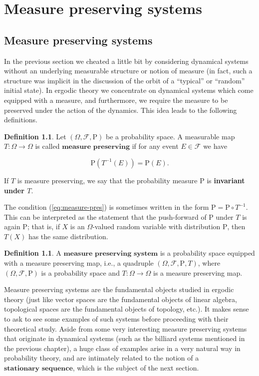 \documentclass[11pt]{report}
\theoremstyle{plain}
\theoremstyle{definition}
\newtheorem{defn}[thm]{Definition}
\begin{document}
\chapter{Measure preserving systems}

\section{Measure preserving systems}
In the previous section we cheated a little bit by considering dynamical systems without an underlying measurable structure or notion of measure (in fact, such a structure was implicit in the discussion of the orbit of a ``typical'' or ``random'' initial state). In ergodic theory we concentrate on dynamical systems which come equipped with a measure, and furthermore, we require the measure to be preserved under the action of the dynamics. This idea leads to the following definitions.

\begin{defn}
Let $(\Omega, \mathcal{F}, \mathrm{P})$ be a probability space. A measurable map $T:\Omega\to\Omega$ is called $\textbf{measure preserving}$ if for any event $E\in\mathcal{F}$ we have

\begin{equation*} \tag{13}\label{eq:measure-pres}
\mathrm{P}(T^{-1}(E)) = \mathrm{P}(E).
\end{equation*}

If $T$ is measure preserving, we say that the probability measure $\mathrm{P}$ is \textbf{invariant under $T$}.
\end{defn}

The condition (\ref{eq:measure-pres}) is sometimes written in the form $\mathrm{P}=\mathrm{P}\circ T^{-1}$. This can be interpreted as the statement that the push-forward of $\mathrm{P}$ under $T$ is again $\mathrm{P}$; that is, if $X$ is an $\Omega$-valued random variable with distribution $\mathrm{P}$, then $T(X)$ has the same distribution.

\begin{defn}
A $\textbf{measure preserving system}$ is a probability space equipped with a measure preserving map, i.e., a quadruple $(\Omega, \mathcal{F}, \mathrm{P}, T)$, where $(\Omega,\mathcal{F},\mathrm{P})$ is a probability space and $T:\Omega\to\Omega$ is a measure preserving map.
\end{defn}

Measure preserving systems are the fundamental objects studied in ergodic theory (just like vector spaces are the fundamental objects of linear algebra, topological spaces are the fundamental objects of topology, etc.). It makes sense to ask to see some examples of such systems before proceeding with their theoretical study. Aside from some very interesting measure preserving systems that originate in dynamical systems (such as the billiard systems mentioned in the previous chapter), a huge class of examples arise in a very natural way in probability theory, and are intimately related to the notion of a $\textbf{stationary sequence}$, which is the subject of the next section.
\end{document}
